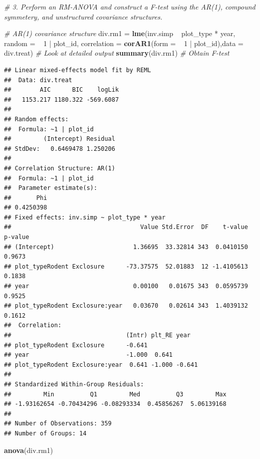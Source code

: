 \documentclass[]{article}
\newenvironment{Shaded}{\begin{snugshade}}{\end{snugshade}}
\newcommand{\KeywordTok}[1]{\textcolor[rgb]{0.13,0.29,0.53}{\textbf{{#1}}}}
\newcommand{\DataTypeTok}[1]{\textcolor[rgb]{0.13,0.29,0.53}{{#1}}}
\newcommand{\DecValTok}[1]{\textcolor[rgb]{0.00,0.00,0.81}{{#1}}}
\newcommand{\StringTok}[1]{\textcolor[rgb]{0.31,0.60,0.02}{{#1}}}
\newcommand{\CommentTok}[1]{\textcolor[rgb]{0.56,0.35,0.01}{\textit{{#1}}}}
\newcommand{\NormalTok}[1]{{#1}}
\begin{document}
\begin{Shaded}
\begin{Highlighting}[]
\CommentTok{# 3. Perform an RM-ANOVA and construct a F-test using the AR(1), compound symmetery, and unstructured covariance structures.}

\CommentTok{# AR(1) covariance structure}
\NormalTok{div.rm1 =}\StringTok{ }\KeywordTok{lme}\NormalTok{(inv.simp ~}\StringTok{ }\NormalTok{plot_type *}\StringTok{ }\NormalTok{year, }\DataTypeTok{random =} \NormalTok{~}\StringTok{ }\DecValTok{1} \NormalTok{|}\StringTok{ }\NormalTok{plot_id, }\DataTypeTok{correlation =} \KeywordTok{corAR1}\NormalTok{(}\DataTypeTok{form =} \NormalTok{~}\StringTok{ }\DecValTok{1} \NormalTok{|}\StringTok{ }\NormalTok{plot_id),}\DataTypeTok{data =} \NormalTok{div.treat) }\CommentTok{# Look at detailed output}
\KeywordTok{summary}\NormalTok{(div.rm1) }\CommentTok{# Obtain F-test}
\end{Highlighting}
\end{Shaded}

\begin{verbatim}
## Linear mixed-effects model fit by REML
##  Data: div.treat 
##        AIC      BIC    logLik
##   1153.217 1180.322 -569.6087
## 
## Random effects:
##  Formula: ~1 | plot_id
##         (Intercept) Residual
## StdDev:   0.6469478 1.250206
## 
## Correlation Structure: AR(1)
##  Formula: ~1 | plot_id 
##  Parameter estimate(s):
##       Phi 
## 0.4250398 
## Fixed effects: inv.simp ~ plot_type * year 
##                                    Value Std.Error  DF    t-value p-value
## (Intercept)                      1.36695  33.32814 343  0.0410150  0.9673
## plot_typeRodent Exclosure      -73.37575  52.01883  12 -1.4105613  0.1838
## year                             0.00100   0.01675 343  0.0595739  0.9525
## plot_typeRodent Exclosure:year   0.03670   0.02614 343  1.4039132  0.1612
##  Correlation: 
##                                (Intr) plt_RE year  
## plot_typeRodent Exclosure      -0.641              
## year                           -1.000  0.641       
## plot_typeRodent Exclosure:year  0.641 -1.000 -0.641
## 
## Standardized Within-Group Residuals:
##         Min          Q1         Med          Q3         Max 
## -1.93162654 -0.70434296 -0.08293334  0.45856267  5.06139168 
## 
## Number of Observations: 359
## Number of Groups: 14
\end{verbatim}

\begin{Shaded}
\begin{Highlighting}[]
\KeywordTok{anova}\NormalTok{(div.rm1)}
\end{Highlighting}
\end{Shaded}
\end{document}
